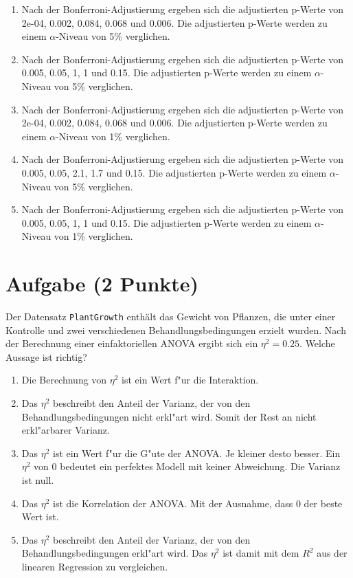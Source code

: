 \documentclass[a4paper, 10pt]{scrartcl}\usepackage[]{graphicx}\usepackage[]{xcolor}
\begin{document}
\begin{enumerate}
\item [\textbf{A} \msquare] Nach der Bonferroni-Adjustierung ergeben sich die adjustierten p-Werte von 2e-04, 0.002, 0.084, 0.068 und 0.006. Die adjustierten p-Werte werden zu einem $\alpha$-Niveau von 5\% verglichen.
\item [\textbf{B} \msquare] Nach der Bonferroni-Adjustierung ergeben sich die adjustierten p-Werte von 0.005, 0.05, 1, 1 und 0.15. Die adjustierten p-Werte werden zu einem $\alpha$-Niveau von 5\% verglichen.
\item [\textbf{C} \msquare] Nach der Bonferroni-Adjustierung ergeben sich die adjustierten p-Werte von 2e-04, 0.002, 0.084, 0.068 und 0.006. Die adjustierten p-Werte werden zu einem $\alpha$-Niveau von 1\% verglichen.
\item [\textbf{D} \msquare] Nach der Bonferroni-Adjustierung ergeben sich die adjustierten p-Werte von 0.005, 0.05, 2.1, 1.7 und 0.15. Die adjustierten p-Werte werden zu einem $\alpha$-Niveau von 5\% verglichen.
\item [\textbf{E} \msquare] Nach der Bonferroni-Adjustierung ergeben sich die adjustierten p-Werte von 0.005, 0.05, 1, 1 und 0.15. Die adjustierten p-Werte werden zu einem $\alpha$-Niveau von 1\% verglichen.
\end{enumerate} 

\section{Aufgabe \hfill (2 Punkte)}



Der Datensatz \texttt{PlantGrowth} enth{\"a}lt das Gewicht von Pflanzen, die
unter einer Kontrolle und zwei verschiedenen Behandlungsbedingungen erzielt
wurden. Nach der Berechnung einer einfaktoriellen ANOVA ergibt sich ein
$\eta^2 = 0.25$. Welche Aussage ist richtig?



\begin{enumerate}
\item [\textbf{A} \msquare] Die Berechnung von $\eta^2$ ist ein Wert f{"u}r die Interaktion.
\item [\textbf{B} \msquare] Das $\eta^2$ beschreibt den Anteil der Varianz, der von den Behandlungsbedingungen nicht erkl{"a}rt wird. Somit der Rest an nicht erkl{"a}rbarer Varianz.
\item [\textbf{C} \msquare] Das $\eta^2$ ist ein Wert f{"u}r die G{"u}te der ANOVA. Je kleiner desto besser. Ein $\eta^2$ von 0 bedeutet ein perfektes Modell mit keiner Abweichung. Die Varianz ist null.
\item [\textbf{D} \msquare] Das $\eta^2$ ist die Korrelation der ANOVA. Mit der Ausnahme, dass 0 der beste Wert ist.
\item [\textbf{E} \msquare] Das $\eta^2$ beschreibt den Anteil der Varianz, der von den Behandlungsbedingungen erkl{"a}rt wird. Das $\eta^2$ ist damit mit dem $R^2$ aus der linearen Regression zu vergleichen.
\end{enumerate} 
\end{document}
